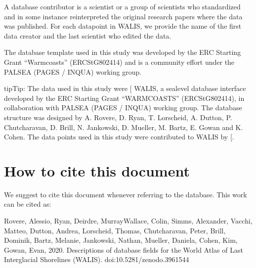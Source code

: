 \documentclass[letterpaper,10pt,english]{sphinxmanual}
\begin{document}
 \sphinxhyphen{} A database contributor is a scientist or a group of scientists who standardized and in some instance re\sphinxhyphen{}interpreted the original research papers where the data was published. For each datapoint in WALIS, we provide the name of the first data creator and the last scientist who edited the data.

 \sphinxhyphen{} The database template used in this study was developed by the ERC Starting Grant “Warmcoasts” (ERC\sphinxhyphen{}StG\sphinxhyphen{}802414) and is a community effort under the PALSEA (PAGES / INQUA) working group.

\begin{sphinxadmonition}{tip}{Tip:}
 The data used in this study were {[}\sphinxstyleemphasis{extracted from / compiled in}{]} WALIS, a sea\sphinxhyphen{}level database interface developed by the ERC Starting Grant “WARMCOASTS” (ERC\sphinxhyphen{}StG\sphinxhyphen{}802414), in collaboration with PALSEA (PAGES / INQUA) working group. The database structure was designed by A. Rovere, D. Ryan, T. Lorscheid, A. Dutton, P. Chutcharavan, D. Brill, N. Jankowski, D. Mueller, M. Bartz, E. Gowan and K. Cohen. The data points used in this study were contributed to WALIS by {[}\sphinxstyleemphasis{list names of contributors here}{]}.
\end{sphinxadmonition}


\section{How to cite this document}
\label{\detokenize{first:how-to-cite-this-document}}
We suggest to cite this document whenever referring to the database. This work can be cited as:

Rovere, Alessio, Ryan, Deirdre, Murray\sphinxhyphen{}Wallace, Colin, Simms, Alexander, Vacchi, Matteo, Dutton, Andrea, Lorscheid, Thomas, Chutcharavan, Peter, Brill, Dominik, Bartz, Melanie, Jankowski, Nathan, Mueller, Daniela, Cohen, Kim, Gowan, Evan, 2020. Descriptions of database fields for the World Atlas of Last Interglacial Shorelines (WALIS). doi:10.5281/zenodo.3961544

\end{document}
